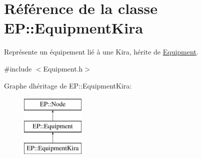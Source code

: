 \hypertarget{class_e_p_1_1_equipment_kira}{}\section{Référence de la classe EP\+:\+:Equipment\+Kira}
\label{class_e_p_1_1_equipment_kira}


Représente un équipement lié à une Kira, hérite de \hyperlink{class_e_p_1_1_equipment}{Equipment}.  




{\ttfamily \#include $<$Equipment.\+h$>$}

Graphe d\textquotesingle{}héritage de EP\+:\+:Equipment\+Kira\+:\begin{figure}[H]
\begin{center}
\leavevmode
\includegraphics[height=3.000000cm]{class_e_p_1_1_equipment_kira}
\end{center}
\end{figure}

